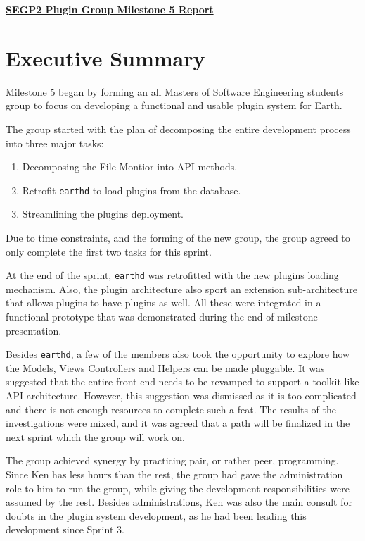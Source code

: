 \documentclass{article}
\begin{document}
\pagestyle{headings}

\begin{center}
{\textbf{\underline{SEGP2 Plugin Group Milestone 5 Report}}}
\end{center}


\section*{Executive Summary}

Milestone 5 began by forming an all Masters of Software Engineering students group to focus on developing a functional and usable plugin system for Earth. 

The group started with the plan of decomposing the entire development process into three major tasks:

\begin{enumerate}
	\item Decomposing the File Montior into API methods.
	\item Retrofit \texttt{earthd} to load plugins from the database.
	\item Streamlining the plugins deployment.
\end{enumerate}

Due to time constraints, and the forming of the new group, the group agreed to only complete the first two tasks for this sprint. 

At the end of the sprint, \texttt{earthd} was retrofitted with the new plugins loading mechanism. Also, the plugin architecture also sport an extension sub-architecture that allows plugins to have plugins as well. All these were integrated in a functional prototype that was demonstrated during the end of milestone presentation. 

Besides \texttt{earthd}, a few of the members also took the opportunity to explore how the Models, Views Controllers and Helpers can be made pluggable. It was suggested that the entire front-end needs to be revamped to support a toolkit like API architecture. However, this suggestion was dismissed as it is too complicated and there is not enough resources to complete such a feat. The results of the investigations were mixed, and it was agreed that a path will be finalized in the next sprint which the group will work on. 

The group achieved synergy by practicing pair, or rather peer, programming. Since Ken has less hours than the rest, the group had gave the administration role to him to run the group, while giving the development responsibilities were assumed by the rest. Besides administrations, Ken was also the main consult for doubts in the plugin system development, as he had been leading this development since Sprint 3. 
\end{document}

